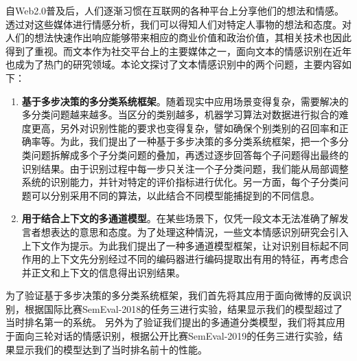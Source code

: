 \begin{cabstract}

自Web2.0普及后，人们逐渐习惯在互联网的各种平台上分享他们的想法和情感。透过对这些媒体进行情感分析，我们可以得知人们对特定人事物的想法和态度。对人们的想法快速作出响应能够带来相应的商业价值和政治价值，其相关技术也因此得到了重视。而文本作为社交平台上的主要媒体之一，面向文本的情感识别在近年也成为了热门的研究领域。本论文探讨了文本情感识别中的两个问题，主要内容如下：

\begin{enumerate}

\item {\bf 基于多步决策的多分类系统框架}。随着现实中应用场景变得复杂，需要解决的多分类问题越来越多。当区分的类别越多，机器学习算法对数据进行拟合的难度更高，另外对识别性能的要求也变得复杂，譬如确保个别类别的召回率和正确率等。为此，我们提出了一种基于多步决策的多分类系统框架，把一个多分类问题拆解成多个子分类问题的叠加，再透过逐步回答每个子问题得出最终的识别结果。由于识别过程中每一步只关注一个子分类问题，我们能从局部调整系统的识别能力，并针对特定的评价指标进行优化。另一方面，每个子分类问题可以分别采用不同的算法，以此结合不同模型能捕捉到的不同信息。

\item {\bf 用于结合上下文的多通道模型}。在某些场景下，仅凭一段文本无法准确了解发言者想表达的意思和态度。为了处理这种情況，一些文本情感识別研究会引入上下文作为提示。为此我们提出了一种多通道模型框架，让对识别目标起不同作用的上下文先分别经过不同的编码器进行编码提取出有用的特征，再考虑合并正文和上下文的信息得出识别结果。

\end{enumerate}

为了验证基于多步决策的多分类系统框架，我们首先将其应用于面向微博的反讽识别，根据国际比赛SemEval-2018的任务三进行实验，结果显示我们的模型超过了当时排名第一的系统。
另外为了验证我们提出的多通道分类模型，我们将其应用于面向三轮对话的情感识别，根据公开比赛SemEval-2019的任务三进行实验，结果显示我们的模型达到了当时排名前十的性能。


\end{cabstract}


